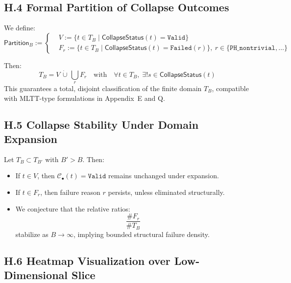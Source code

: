 \documentclass[11pt]{article}
\begin{document}
\subsection*{H.4 Formal Partition of Collapse Outcomes}

We define:
\[
\mathsf{Partition}_B := \left\{
\begin{aligned}
& V := \{ t \in T_B \mid \mathsf{CollapseStatus}(t) = \texttt{Valid} \} \\
& F_r := \{ t \in T_B \mid \mathsf{CollapseStatus}(t) = \texttt{Failed}(r) \},\ r \in \{\texttt{PH\_nontrivial}, \ldots \}
\end{aligned}
\right.
\]

Then:
\[
T_B = V \,\dot{\cup}\, \bigcup_{r} F_r
\quad\text{with}\quad \forall t \in T_B,\; \exists! s \in \mathsf{CollapseStatus}(t)
\]
This guarantees a total, disjoint classification of the finite domain \( T_B \),  
compatible with MLTT-type formulations in Appendix~E and Q.

\subsection*{H.5 Collapse Stability Under Domain Expansion}

Let \( T_B \subset T_{B'} \) with \( B' > B \). Then:
\begin{itemize}
  \item If \( t \in V \), then \( \mathcal{C}_\bullet(t) = \texttt{Valid} \) remains unchanged under expansion.
  \item If \( t \in F_r \), then failure reason \( r \) persists, unless eliminated structurally.
  \item We conjecture that the relative ratios:
  \[
  \frac{\# F_r}{\# T_B}
  \]
  stabilize as \( B \to \infty \), implying bounded structural failure density.
\end{itemize}

\subsection*{H.6 Heatmap Visualization over Low-Dimensional Slice}

\begin{center}
\end{center}
\end{document}
